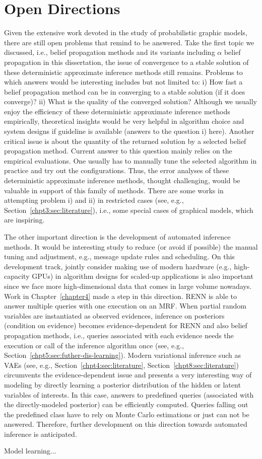 \section{Open Directions}
Given the extensive work devoted in the study of probabilistic graphic models, there are still open problems that remind to be answered. Take the first topic we discussed, i.e., belief propagation methods and its variants including $\alpha$ belief propagation in this dissertation, the issue of convergence to a stable solution of these deterministic approximate inference methods still remains. Problems to which answers would be interesting includes but not limited to: i) How fast a belief propagation method can be in converging to a stable solution (if it does converge)? ii) What is the quality of the converged solution? Although we usually enjoy the efficiency of these deterministic approximate inference methods empirically, theoretical insights would be very helpful in algorithm choice and system designs if guideline is available (answers to the question i) here). Another critical issue is about the quantity of the returned solution by a selected belief propagation method. Current answer to this question mainly relies on the empirical evaluations. One usually has to manually tune the selected algorithm in practice and try out the configurations. Thus, the error analyses of these deterministic approximate inference methods, thought challenging, would be valuable in support of this family of methods. There are some works in attempting problem i) and ii) in restricted cases (see, e.g., Section~\ref{chpt3:sec:literature}), i.e., some special cases of graphical models, which are inspiring. 

The other important direction is the development of automated inference methods. It would be interesting study to reduce (or avoid if possible) the manual tuning and adjustment, e.g., message update rules and scheduling. On this development track, jointly consider making use of modern hardware (e.g., high-capacity GPUs) in algorithm designs for scaled-up applications is also important since we face more high-dimensional data that comes in large volume nowadays. Work in Chapter~\ref{chapter4} made a step in this direction. RENN is able to answer multiple queries with one execution on an MRF. When partial random variables are instantiated as observed evidences, inference on posteriors (condition on evidence) becomes evidence-dependent for RENN and also belief propagation methods, i.e., queries associated with each evidence needs the execution or call of the inference algorithm once (see, e.g., Section~\ref{chpt5:sec:futher-dis-learning}). Modern variational inference such as VAEs (see, e.g., Section~\ref{chpt4:sec:literature}, Section~\ref{chpt8:sec:literature}) circumvents the evidence-dependent issue and presents a very interesting way of modeling by directly learning a posterior distribution of the hidden or latent variables of interests. In this case, answers to predefined queries (associated with the directly-modeled posterior) can be efficiently computed. Queries falling out the predefined class have to rely on Monte Carlo estimations or just can not be answered. Therefore, further development on this direction towards automated inference is anticipated.


Model learning...


